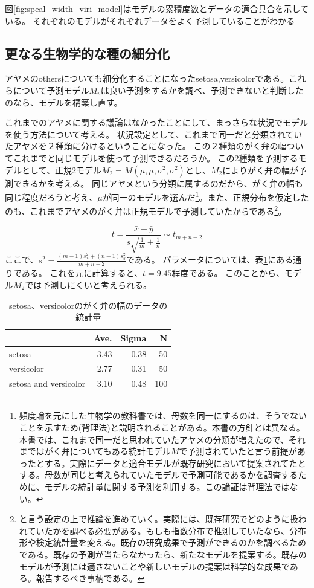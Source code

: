 図\ref{fig:speal_width_viri_model}はモデルの累積度数とデータの適合具合を示している。
それぞれのモデルがそれぞれデータをよく予測していることがわかる

\subsection{更なる生物学的な種の細分化}
アヤメのothersについても細分化することになったsetosa,versicolorである。これらについて予測モデル$M_v$は良い予測をするかを調べ、予測できないと判断したのなら、モデルを構築し直す。

これまでのアヤメに関する議論はなかったことにして、まっさらな状況でモデルを使う方法について考える。
状況設定として、これまで同一だと分類されていたアヤメを２種類に分けるということになった。
この２種類のがく弁の幅ついてこれまでと同じモデルを使って予測できるだろうか。
この$2$種類を予測するモデルとして、正規2モデル$M_2=M(\mu,\mu,\sigma^2,\sigma^2)$とし、$M_2$によりがく弁の幅が予測できるかを考える。
同じアヤメという分類に属するのだから、がく弁の幅も同じ程度だろうと考え、$\mu$が同一のモデルを選んだ\footnote{頻度論を元にした生物学の教科書では、母数を同一にするのは、そうでないことを示すため(背理法)と説明されることがある。本書の方針とは異なる。本書では、これまで同一だと思われていたアヤメの分類が増えたので、それまではがく弁についてもある統計モデル$M$で予測されていたと言う前提があったとする。実際にデータと適合モデルが既存研究において提案されてたとする。母数が同じと考えられていたモデルで予測可能であるかを調査するために、モデルの統計量に関する予測を利用する。この論証は背理法ではない。}。また、正規分布を仮定したのも、これまでアヤメのがく弁は正規モデルで予測していたからである\footnote{と言う設定の上で推論を進めていく。実際には、既存研究でどのように扱われていたかを調べる必要がある。もしも指数分布で推測していたなら、分布形や検定統計量を変える。既存の研究成果で予測ができるのかを調べるためである。既存の予測が当たらなかったら、新たなモデルを提案する。既存のモデルが予測には適さないことや新しいモデルの提案は科学的な成果である。報告するべき事柄である。}。

\begin{equation*}
 t = \frac{\bar{x}-\bar{y}}{s\sqrt{\frac{1}{m} + \frac{1}{n} }} \sim t_{m+n-2}
\end{equation*}
ここで、$s^2=\frac{(m-1)s_x^2+(n-1)s_y^2}{m+n-2}$である。
パラメータについては、表\ref{fig:seto_versi_speal_w_summary}にある通りである。
これを元に計算すると、$t=9.45$程度である。
このことから、モデル$M_2$では予測しにくいと考えられる。

\begin{table}
 \caption{setosa、versicolorのがく弁の幅のデータの統計量}
 \label{fig:seto_versi_speal_w_summary}
 \centering
 \begin{tabular}{lrrr}
  \hline
  {} &  Ave. &  Sigma &   N \\
  \hline \hline
  setosa     &  3.43 &   0.38 &  50 \\
  versicolor &  2.77 &   0.31 &  50 \\
  setosa and versicolor &  3.10 &   0.48 &  100 \\
  \hline
 \end{tabular}
\end{table}

